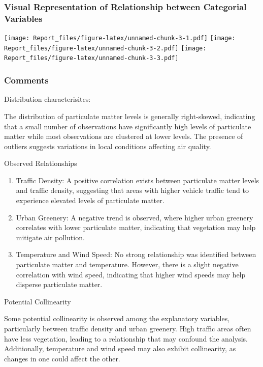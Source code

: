 \documentclass[
]{article}
\begin{document}
\hypertarget{visual-representation-of-relationship-between-categorial-variables}{%
\subsubsection{Visual Representation of Relationship between Categorial
Variables}\label{visual-representation-of-relationship-between-categorial-variables}}

\texttt{[image: Report\_files/figure-latex/unnamed-chunk-3-1.pdf]}
\texttt{[image: Report\_files/figure-latex/unnamed-chunk-3-2.pdf]}
\texttt{[image: Report\_files/figure-latex/unnamed-chunk-3-3.pdf]}

\hypertarget{comments}{%
\subsubsection{Comments}\label{comments}}

Distribution characterisitcs:

The distribution of particulate matter levels is generally right-skewed,
indicating that a small number of observations have significantly high
levels of particulate matter while most observations are clustered at
lower levels. The presence of outliers suggests variations in local
conditions affecting air quality.

Observed Relationships

\begin{enumerate}
\def\labelenumi{\arabic{enumi}.}
\item
  Traffic Density: A positive correlation exists between particulate
  matter levels and traffic density, suggesting that areas with higher
  vehicle traffic tend to experience elevated levels of particulate
  matter.
\item
  Urban Greenery: A negative trend is observed, where higher urban
  greenery correlates with lower particulate matter, indicating that
  vegetation may help mitigate air pollution.
\item
  Temperature and Wind Speed: No strong relationship was identified
  between particulate matter and temperature. However, there is a slight
  negative correlation with wind speed, indicating that higher wind
  speeds may help disperse particulate matter.
\end{enumerate}

Potential Collinearity

Some potential collinearity is observed among the explanatory variables,
particularly between traffic density and urban greenery. High traffic
areas often have less vegetation, leading to a relationship that may
confound the analysis. Additionally, temperature and wind speed may also
exhibit collinearity, as changes in one could affect the other.
\end{document}
